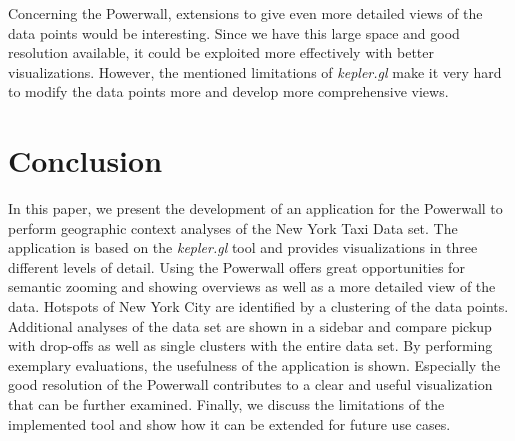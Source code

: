 \documentclass[sigconf, authorversion, nonacm=true]{acmart}
\begin{document}
Concerning the Powerwall, extensions to give even more detailed views of the data points would be interesting. Since we have this large space and good resolution available, it could be exploited more effectively with better visualizations. However, the mentioned limitations of \textit{kepler.gl} make it very hard to modify the data points more and develop more comprehensive views. 




\section{Conclusion}
\label{sec:conclusion}

In this paper, we present the development of an application for the Powerwall to perform geographic context analyses of the New York Taxi Data set. The application is based on the \textit{kepler.gl} tool and provides visualizations in three different levels of detail. Using the Powerwall offers great opportunities for semantic zooming and showing overviews as well as a more detailed view of the data. Hotspots of New York City are identified by a clustering of the data points. Additional analyses of the data set are shown in a sidebar and compare pickup with drop-offs as well as single clusters with the entire data set. By performing exemplary evaluations, the usefulness of the application is shown. Especially the good resolution of the Powerwall contributes to a clear and useful visualization that can be further examined. Finally, we discuss the limitations of the implemented tool and show how it can be extended for future use cases.










\end{document}
